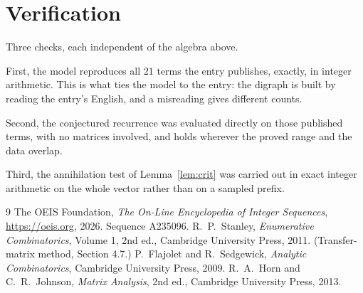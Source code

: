 \documentclass[11pt,a4paper]{article}
\theoremstyle{plain}
\theoremstyle{definition}
\begin{document}
\section{Verification}

Three checks, each independent of the algebra above.

First, the model reproduces all $21$ terms the entry publishes, exactly, in integer
arithmetic. This is what ties the model to the entry: the digraph is built by reading the
entry's English, and a misreading gives different counts.

Second, the conjectured recurrence was evaluated directly on those published terms, with no
matrices involved, and holds wherever the proved range and the data overlap.

Third, the annihilation test of Lemma~\ref{lem:crit} was carried out in exact integer
arithmetic on the whole vector rather than on a sampled prefix.

\begin{thebibliography}{9}
 The OEIS Foundation, \emph{The On-Line Encyclopedia of Integer
Sequences}, \url{https://oeis.org}, 2026. Sequence A235096.
 R.~P.~Stanley, \emph{Enumerative Combinatorics}, Volume 1, 2nd ed.,
Cambridge University Press, 2011. (Transfer-matrix method, Section 4.7.)
 P.~Flajolet and R.~Sedgewick, \emph{Analytic Combinatorics}, Cambridge
University Press, 2009.
 R.~A.~Horn and C.~R.~Johnson, \emph{Matrix Analysis}, 2nd ed., Cambridge
University Press, 2013.
\end{thebibliography}
\end{document}
